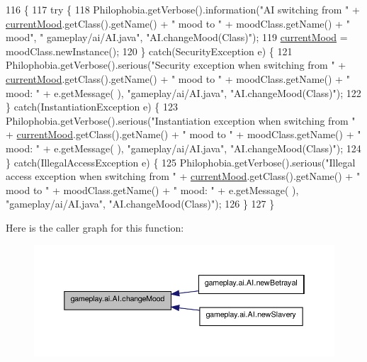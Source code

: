 \begin{DoxyCode}
116                                                      \{  
117         \textcolor{keywordflow}{try} \{
118             Philophobia.getVerbose().information(\textcolor{stringliteral}{"AI switching from "} + 
      \hyperlink{a00001_aad698027b11d4b58a4da8c2952484ccb}{currentMood}.getClass().getName() + \textcolor{stringliteral}{" mood to "} + moodClass.getName() + \textcolor{stringliteral}{" mood"}, \textcolor{stringliteral}{"
      gameplay/ai/AI.java"}, \textcolor{stringliteral}{"AI.changeMood(Class)"});
119             \hyperlink{a00001_aad698027b11d4b58a4da8c2952484ccb}{currentMood} = moodClass.newInstance();
120         \} \textcolor{keywordflow}{catch}(SecurityException e) \{
121             Philophobia.getVerbose().serious(\textcolor{stringliteral}{"Security exception when switching from "} + 
      \hyperlink{a00001_aad698027b11d4b58a4da8c2952484ccb}{currentMood}.getClass().getName() + \textcolor{stringliteral}{" mood to "} + moodClass.getName() + \textcolor{stringliteral}{" mood: "} + e.getMessage(
      ), \textcolor{stringliteral}{"gameplay/ai/AI.java"}, \textcolor{stringliteral}{"AI.changeMood(Class)"});
122         \} \textcolor{keywordflow}{catch}(InstantiationException e) \{
123             Philophobia.getVerbose().serious(\textcolor{stringliteral}{"Instantiation exception when switching from "} + 
      \hyperlink{a00001_aad698027b11d4b58a4da8c2952484ccb}{currentMood}.getClass().getName() + \textcolor{stringliteral}{" mood to "} + moodClass.getName() + \textcolor{stringliteral}{" mood: "} + e.getMessage(
      ), \textcolor{stringliteral}{"gameplay/ai/AI.java"}, \textcolor{stringliteral}{"AI.changeMood(Class)"});
124         \} \textcolor{keywordflow}{catch}(IllegalAccessException e) \{
125             Philophobia.getVerbose().serious(\textcolor{stringliteral}{"Illegal access exception when switching from "} + 
      \hyperlink{a00001_aad698027b11d4b58a4da8c2952484ccb}{currentMood}.getClass().getName() + \textcolor{stringliteral}{" mood to "} + moodClass.getName() + \textcolor{stringliteral}{" mood: "} + e.getMessage(
      ), \textcolor{stringliteral}{"gameplay/ai/AI.java"}, \textcolor{stringliteral}{"AI.changeMood(Class)"});
126         \} 
127     \}
\end{DoxyCode}


Here is the caller graph for this function\-:
\nopagebreak
\begin{figure}[H]
\begin{center}
\leavevmode
\includegraphics[width=350pt]{a00001_adbb46250627224cb4cd42ad99eaf42ba_icgraph}
\end{center}
\end{figure}


